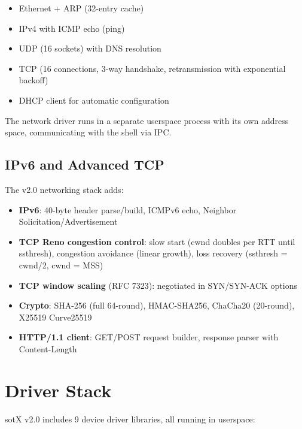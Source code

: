 \documentclass[11pt,letterpaper]{article}
\theoremstyle{definition}
\begin{document}
\begin{itemize}[nosep]
    \item Ethernet + ARP (32-entry cache)
    \item IPv4 with ICMP echo (ping)
    \item UDP (16 sockets) with DNS resolution
    \item TCP (16 connections, 3-way handshake, retransmission with
          exponential backoff)
    \item DHCP client for automatic configuration
\end{itemize}

The network driver runs in a separate userspace process with its own address
space, communicating with the shell via IPC.

\subsection{IPv6 and Advanced TCP}

The v2.0 networking stack adds:
\begin{itemize}[nosep]
    \item \textbf{IPv6}: 40-byte header parse/build, ICMPv6 echo, Neighbor Solicitation/Advertisement
    \item \textbf{TCP Reno congestion control}: slow start (cwnd doubles per RTT until ssthresh),
          congestion avoidance (linear growth), loss recovery (ssthresh = cwnd/2, cwnd = MSS)
    \item \textbf{TCP window scaling} (RFC 7323): negotiated in SYN/SYN-ACK options
    \item \textbf{Crypto}: SHA-256 (full 64-round), HMAC-SHA256, ChaCha20 (20-round), X25519 Curve25519
    \item \textbf{HTTP/1.1 client}: GET/POST request builder, response parser with Content-Length
\end{itemize}

\section{Driver Stack}
\label{sec:drivers}

sotX v2.0 includes 9 device driver libraries, all running in userspace:
\end{document}
